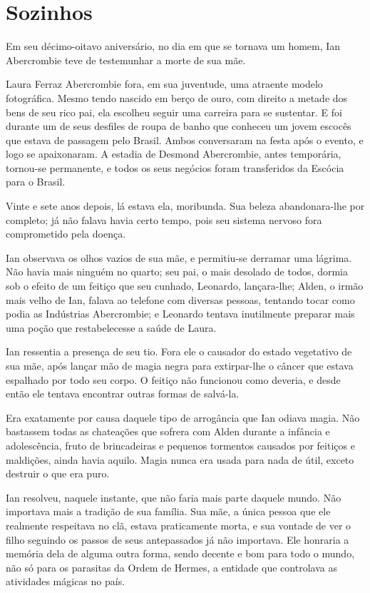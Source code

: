 \chapter{Sozinhos}


Em seu décimo-oitavo aniversário, no dia em que se tornava um homem, Ian
Abercrombie teve de testemunhar a morte de sua mãe.

Laura Ferraz Abercrombie fora, em sua juventude, uma atraente modelo
fotográfica. Mesmo tendo nascido em berço de ouro, com direito a metade
dos bens de seu rico pai, ela escolheu seguir uma carreira para se
sustentar. E foi durante um de seus desfiles de roupa de banho que
conheceu um jovem escocês que estava de passagem pelo Brasil. Ambos
conversaram na festa após o evento, e logo se apaixonaram. A estadia de
Desmond Abercrombie, antes temporária, tornou-se permanente, e todos os
seus negócios foram transferidos da Escócia para o Brasil.

Vinte e sete anos depois, lá estava ela, moribunda. Sua beleza
abandonara-lhe por completo; já não falava havia certo tempo, pois seu
sistema nervoso fora comprometido pela doença.

Ian observava os olhos vazios de sua mãe, e permitiu-se derramar uma
lágrima. Não havia mais ninguém no quarto; seu pai, o mais desolado de
todos, dormia sob o efeito de um feitiço que seu cunhado, Leonardo,
lançara-lhe; Alden, o irmão mais velho de Ian, falava ao telefone com
diversas pessoas, tentando tocar como podia as Indústrias Abercrombie; e
Leonardo tentava inutilmente preparar mais uma poção que restabelecesse
a saúde de Laura.

Ian ressentia a presença de seu tio. Fora ele o causador do estado
vegetativo de sua mãe, após lançar mão de magia negra para extirpar-lhe
o câncer que estava espalhado por todo seu corpo. O feitiço não
funcionou como deveria, e desde então ele tentava encontrar outras
formas de salvá-la.

Era exatamente por causa daquele tipo de arrogância que Ian odiava
magia. Não bastassem todas as chateações que sofrera com Alden durante a
infância e adolescência, fruto de brincadeiras e pequenos tormentos
causados por feitiços e maldições, ainda havia aquilo. Magia nunca era
usada para nada de útil, exceto destruir o que era puro.

Ian resolveu, naquele instante, que não faria mais parte daquele mundo.
Não importava mais a tradição de sua família. Sua mãe, a única pessoa
que ele realmente respeitava no clã, estava praticamente morta, e sua
vontade de ver o filho seguindo os passos de seus antepassados já não
importava. Ele honraria a memória dela de alguma outra forma, sendo
decente e bom para todo o mundo, não só para os parasitas da Ordem de
Hermes, a entidade que controlava as atividades mágicas no país.

